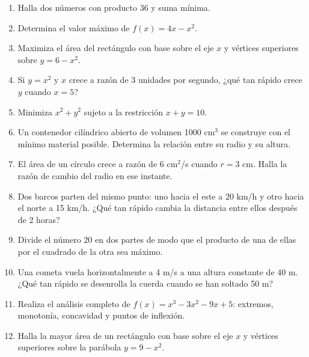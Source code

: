 \documentclass[12pt, letterpaper]{article}
\begin{document}
\begin{enumerate}[resume=ejercicios, leftmargin=*]
  \item \facil{} Halla dos números con producto 36 y suma mínima.

  \item \medio{} Determina el valor máximo de $f(x) = 4x - x^2$.

  \item \medio{} Maximiza el área del rectángulo con base sobre el eje $x$ y vértices superiores sobre $y = 6 - x^2$.

  \item \medio{} Si $y = x^2$ y $x$ crece a razón de 3 unidades por segundo, ¿qué tan rápido crece $y$ cuando $x = 5$?

  \item \dificil{} Minimiza $x^2 + y^2$ sujeto a la restricción $x + y = 10$.

  \item \dificil{} Un contenedor cilíndrico abierto de volumen 1000 cm$^3$ se construye con el mínimo material posible. Determina la relación entre su radio y su altura.

  \item \dificil{} El área de un círculo crece a razón de 6 cm$^2$/s cuando $r = 3$ cm. Halla la razón de cambio del radio en ese instante.

  \item \dificil{} Dos barcos parten del mismo punto: uno hacia el este a 20 km/h y otro hacia el norte a 15 km/h. ¿Qué tan rápido cambia la distancia entre ellos después de 2 horas?

  \item \dificil{} Divide el número 20 en dos partes de modo que el producto de una de ellas por el cuadrado de la otra sea máximo.

  \item \dificil{} Una cometa vuela horizontalmente a 4 m/s a una altura constante de 40 m. ¿Qué tan rápido se desenrolla la cuerda cuando se han soltado 50 m?

  \item \muyDificil{} Realiza el análisis completo de $f(x) = x^3 - 3x^2 - 9x + 5$: extremos, monotonía, concavidad y puntos de inflexión.

  \item \muyDificil{} Halla la mayor área de un rectángulo con base sobre el eje $x$ y vértices superiores sobre la parábola $y = 9 - x^2$.
\end{enumerate}
\end{document}
